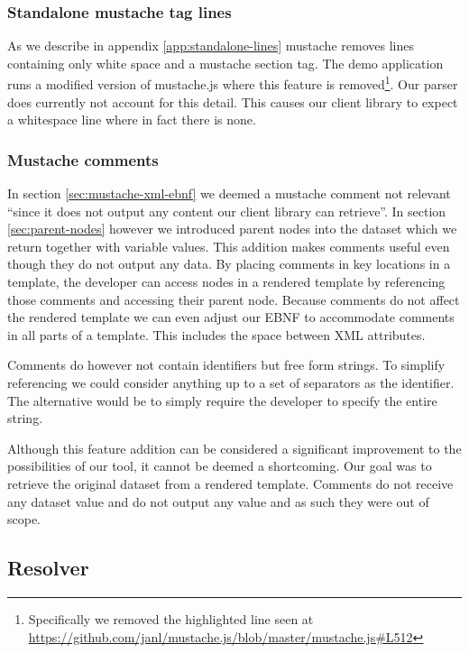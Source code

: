 \documentclass[thesis.tex]{subfiles}
\begin{document}
\subsubsection{Standalone mustache tag lines}
As we describe in appendix \ref{app:standalone-lines} mustache removes
lines containing only white space and a mustache section tag.
The demo application runs a modified version of mustache.js where this feature
is removed\footnote{Specifically we removed the highlighted line seen at
\url{https://github.com/janl/mustache.js/blob/master/mustache.js\#L512}}.
Our parser does currently not account for this detail. This causes
our client library to expect a whitespace line where in fact there is none.

\subsubsection{Mustache comments}
\label{sec:comment-selectors}
In section \ref{sec:mustache-xml-ebnf} we deemed a mustache comment not relevant
``since it does not output any content our client library can retrieve''.
In section \ref{sec:parent-nodes} however we introduced parent nodes into
the dataset which we return together with variable values.
This addition makes comments useful even though they do not output any data.
By placing comments in key locations in a template, the developer can access
nodes in a rendered template by referencing those comments and accessing their
parent node. Because comments do not affect the rendered template we can even
adjust our EBNF to accommodate comments in all parts of a template.
This includes the space between XML attributes.

Comments do however not contain identifiers but free form strings.
To simplify referencing we could consider anything up to a set of
separators as the identifier. The alternative would be to simply require the
developer to specify the entire string.

Although this feature addition can be considered a significant improvement to
the possibilities of our tool, it cannot be deemed a shortcoming.
Our goal was to retrieve the original dataset from a rendered template.
Comments do not receive any dataset value and do not output any value and as
such they were out of scope.

\subsection{Resolver}
\end{document}
